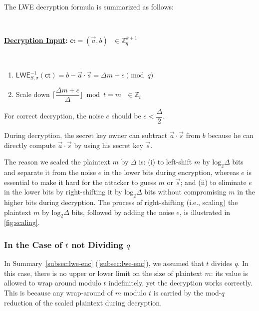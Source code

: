 $ $

The LWE decryption formula is summarized as follows:

$ $

\begin{tcolorbox}[title={\textbf{\tboxlabel{\ref*{subsec:lwe-dec}} LWE Decryption}}]

\textbf{\underline{Decryption Input}:} $\textsf{ct} = (\vec{a}, b) \text{ } \in \mathbb{Z}_q^{k+1}$

$ $

\begin{enumerate}
\item $\textsf{LWE}^{-1}_{S,\sigma}(\textsf{ct}) = b - \vec{a}\cdot \vec{s} = \Delta  m + e \pmod q$

\item Scale down $\Bigg\lceil\dfrac{ \Delta  m + e } {\Delta}\Bigg\rfloor \bmod t = m \text{ } \in \mathbb{Z}_t$
\end{enumerate}

For correct decryption, the noise $e$ should be $e < \dfrac{\Delta}{2}$.

\end{tcolorbox}

During decryption, the secret key owner can subtract $\vec{a} \cdot \vec{s}$ from $b$ because he can directly compute $\vec{a} \cdot \vec{s}$ by using his secret key $\vec{s}$. 

The reason we scaled the plaintext $m$ by $\Delta$ is: (i) to left-shift $m$ by $\text{log}_2\Delta$ bits and separate it from the noise $e$ in the lower bits during encryption, whereas $e$ is essential to make it hard for the attacker to guess $m$ or $\vec{s}$; and (ii) to eliminate $e$ in the lower bits by right-shifting it by $\text{log}_2\Delta$ bits without compromising $m$ in the higher bits during decryption. The process of right-shifting (i.e., scaling) the plaintext $m$ by $\text{log}_2\Delta$ bits, followed by adding the noise $e$, is illustrated in \autoref{fig:scaling}.

\subsubsection{In the Case of $t$ not Dividing $q$}
\label{subsubsec:lwe-noise-bound}

In Summary~\ref*{subsec:lwe-enc} (\autoref{subsec:lwe-enc}), we assumed that $t$ divides $q$. In this case, there is no upper or lower limit on the size of plaintext $m$: its value is allowed to wrap around modulo $t$ indefinitely, yet the decryption works correctly. This is because any wrap-around of $m$
modulo $t$ is carried by the mod-$q$ reduction of the scaled plaintext during decryption.

